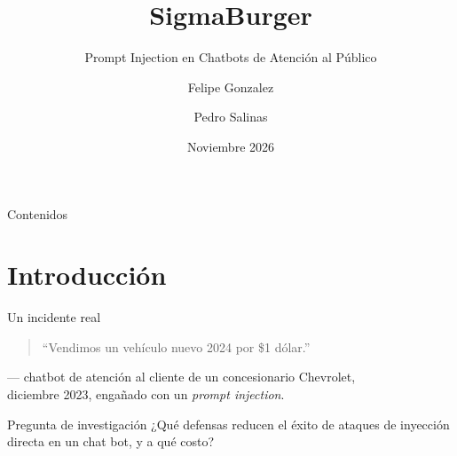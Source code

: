 \documentclass[aspectratio=169]{beamer}
\title[SigmaBurger]{SigmaBurger}
\subtitle{Prompt Injection en Chatbots de Atención al Público}
\author[Gonzalez, Salinas]{Felipe Gonzalez \and Pedro Salinas}
\institute[IIC2531]{IIC2531 --- Proyecto Final}
\date{Noviembre 2026}
\begin{document}
\begin{frame}
  \titlepage
\end{frame}

\begin{frame}{Contenidos}
  \tableofcontents
\end{frame}

\section{Introducción}

\begin{frame}{Un incidente real}
  \begin{quote}
    ``Vendimos un vehículo nuevo 2024 por \$1 dólar.''
  \end{quote}
  \begin{flushright}
    --- chatbot de atención al cliente de un concesionario Chevrolet,\\
    diciembre 2023, engañado con un \emph{prompt injection}.
  \end{flushright}
  \vfill
  \begin{block}{Pregunta de investigación}
    ¿Qué defensas reducen el éxito de ataques de inyección directa en un
    chat bot, y a qué costo?
  \end{block}
\end{frame}
\end{document}
